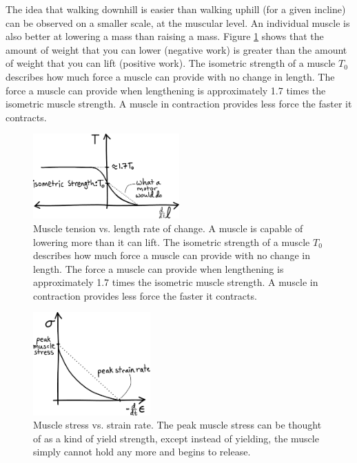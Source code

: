 The idea that walking downhill is easier than walking uphill (for a given incline) can be observed on a smaller scale, at the muscular level. An individual muscle is also better at lowering a mass than raising a mass. Figure \ref{fig:LiftingVsLowering} shows that the amount of weight that you can lower (negative work) is greater than the amount of weight that you can lift (positive work). The isometric strength of a muscle $T_{0}$ describes how much force a muscle can provide with no change in length. The force a muscle can provide when lengthening is approximately 1.7 times the isometric muscle strength. A muscle in contraction provides less force the faster it contracts.

\begin{figure}[htb]		%
\begin{centering}
\includegraphics[width=0.5\textwidth]{Figures/LiftingVsLowering}\par
\end{centering}
\caption[Plot: Muscle Tension vs. Length Rate of Change]{Muscle tension vs. length rate of change. A muscle is capable of lowering more than it can lift. The isometric strength of a muscle $T_{0}$ describes how much force a muscle can provide with no change in length. The force a muscle can provide when lengthening is approximately 1.7 times the isometric muscle strength. A muscle in contraction provides less force the faster it contracts.}
\label{fig:LiftingVsLowering}
\end{figure}
%

\begin{figure}[htb]		%
\begin{centering}
\includegraphics[width=0.4\textwidth]{Figures/PeakMuscleStress}\par
\end{centering}
\caption[Plot: Muscle Stress vs. Strain Rate]{Muscle stress vs. strain rate. The peak muscle stress can be thought of as a kind of yield strength, except instead of yielding, the muscle simply cannot hold any more and begins to release. }
\label{fig:PeakMuscleStress}
\end{figure}
%

